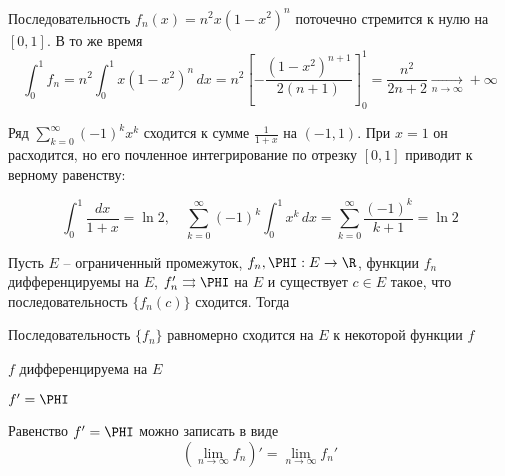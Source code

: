 \begin{Example}
	Последовательность $f_n(x) = n^2 x(1 - x^2)^n$ поточечно стремится к нулю на $[0, 1]$. В то же время
	\[\int_{0}^{1} f_n = n^2 \int_{0}^{1} x(1 - x^2)^n \,dx = n^2 \left[- \frac{(1 - x^2)^{n + 1}}{2(n + 1)}\right]_0^1 = \frac{n^2}{2n + 2} \xrightarrow[n \to \infty]{} +\infty\]  
\end{Example}

\begin{Example}
	Ряд $\sum_{k=0}^{\infty} (-1)^k x^k$ сходится к сумме $\frac{1}{1 + x}$ на $(-1, 1)$. При $x = 1$ он расходится, но его почленное интегрирование по отрезку $[0, 1]$ приводит к верному равенству:
	
	\[\int_{0}^{1} \frac{dx}{1 + x} = \ln 2, \quad \sum_{k=0}^{\infty} (-1)^k \int_{0}^{1} x^k \,dx = \sum_{k=0}^{\infty} \frac{(-1)^k}{k + 1} = \ln 2\]
\end{Example}

\begin{Thm}
	Пусть $E$ -- ограниченный промежуток, $f_n, \PHI : E \to \R$, функции $f_n$ дифференцируемы на $E$, $f_n' \rightrightarrows \PHI$ на $E$ и существует $c \in E$ такое, что последовательность $\{f_n(c)\}$ сходится.
	Тогда
	\begin{MyList}
		\item Последовательность $\{f_n\}$ равномерно сходится на $E$ к некоторой функции $f$
		\item $f$ дифференцируема на $E$ 
		\item $f' = \PHI$ 
	\end{MyList}
	Равенство $f' = \PHI$ можно записать в виде
	\[\left(\lim_{n \to \infty} f_n\right)' = \lim_{n \to \infty} f_n'\]
\end{Thm}

